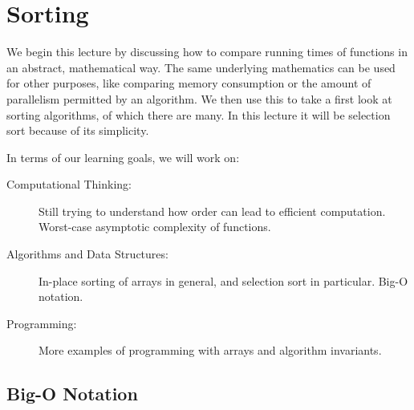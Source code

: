 \chapter{Sorting}
\label{ch:bigo}

\newcommand{\lecnum}{5}
\newcommand{\lecturer}{Frank Pfenning, Rob Simmons}

\maketitle

\begin{preamble}
We begin this lecture by discussing how to compare running times of
functions in an abstract, mathematical way.  The same underlying
mathematics can be used for other purposes, like comparing memory
consumption or the amount of parallelism permitted by an algorithm.  We
then use this to take a first look at sorting algorithms, of which
there are many.  In this lecture it will be selection sort because of
its simplicity.
\end{preamble}

\begin{gram}
In terms of our learning goals, we will work on:
\begin{description}
\item[Computational Thinking:] Still trying to understand how order
  can lead to efficient computation.  Worst-case asymptotic complexity
  of functions.
\item[Algorithms and Data Structures:] In-place sorting of arrays in
  general, and selection sort in particular.  Big-O notation.
\item[Programming:] More examples of programming with arrays and
  algorithm invariants.
\end{description}
\end{gram}


\section{Big-O Notation}
\label{sec:bigo:bigO}

